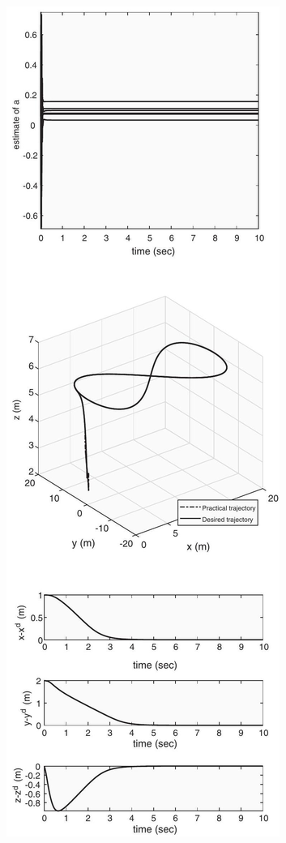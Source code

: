 \documentclass[10pt]{article}
\begin{document}
\begin{center}
\includegraphics[max width=\textwidth]{2023_10_07_eefdf58cc80a47c1244eg-12}
\end{center}
\end{document}
